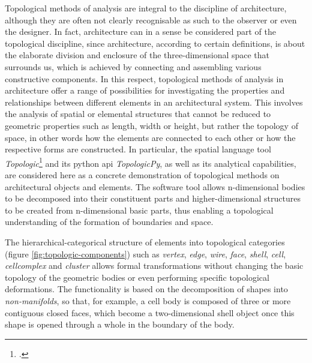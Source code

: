 \documentclass[a4paper, 12pt]{report}
\begin{document}
Topological methods of analysis are integral to the discipline of architecture, although they are often not clearly recognisable as such to the observer or even the designer. In fact, architecture can in a sense be considered part of the topological discipline, since architecture, according to certain definitions, is about the elaborate division and enclosure of the three-dimensional space that surrounds us, which is achieved by connecting and assembling various constructive components. In this respect, topological methods of analysis in architecture offer a range of possibilities for investigating the properties and relationships between different elements in an architectural system. This involves the analysis of spatial or elemental structures that cannot be reduced to geometric properties such as length, width or height, but rather the topology of space, in other words how the elements are connected to each other or how the respective forms are constructed. In particular, the spatial language tool \textit{Topologic}\footcite{aish2018topologic} and its \Gls{python} \acrshort{api} \textit{TopologicPy}, as well as its analytical capabilities, are considered here as a concrete demonstration of topological methods on architectural objects and elements. The software tool allows n-dimensional bodies to be decomposed into their constituent parts and higher-dimensional structures to be created from n-dimensional basic parts, thus enabling a topological understanding of the formation of boundaries and space.

The hierarchical-categorical structure of elements into topological categories (figure \ref{fig:topologic-components}) such as \textit{vertex}, \textit{edge}, \textit{wire}, \textit{face}, \textit{shell}, \textit{cell}, \textit{\gls{cellcomplex}} and \textit{cluster} allows formal transformations without changing the basic topology of the geometric bodies or even performing specific topological deformations. The functionality is based on the decomposition of shapes into \textit{non-\glspl{manifold}}, so that, for example, a cell body is composed of three or more contiguous closed faces, which become a two-dimensional shell object once this shape is opened through a whole in the boundary of the body.
\end{document}
